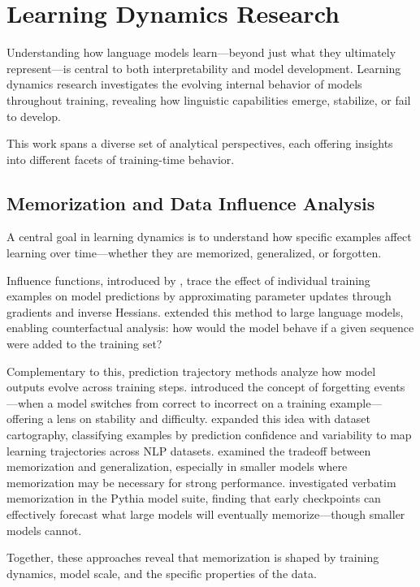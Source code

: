 \section{Learning Dynamics Research}

Understanding how language models learn—beyond just what they ultimately represent—is central to both interpretability and model development. Learning dynamics research investigates the evolving internal behavior of models throughout training, revealing how linguistic capabilities emerge, stabilize, or fail to develop.

This work spans a diverse set of analytical perspectives, each offering insights into different facets of training-time behavior.

\subsection{Memorization and Data Influence Analysis}

A central goal in learning dynamics is to understand how specific examples affect learning over time—whether they are memorized, generalized, or forgotten.

Influence functions, introduced by \citet{koh2017understanding}, trace the effect of individual training examples on model predictions by approximating parameter updates through gradients and inverse Hessians. \citet{grosse2023influence} extended this method to large language models, enabling counterfactual analysis: how would the model behave if a given sequence were added to the training set?

Complementary to this, prediction trajectory methods analyze how model outputs evolve across training steps. \citet{toneva2019empirical} introduced the concept of forgetting events—when a model switches from correct to incorrect on a training example—offering a lens on stability and difficulty. \citet{swayamdipta2020dataset} expanded this idea with dataset cartography, classifying examples by prediction confidence and variability to map learning trajectories across NLP datasets.
\citet{feldman2020does} examined the tradeoff between memorization and generalization, especially in smaller models where memorization may be necessary for strong performance. \citet{biderman2023emergent} investigated verbatim memorization in the Pythia model suite, finding that early checkpoints can effectively forecast what large models will eventually memorize—though smaller models cannot.

Together, these approaches reveal that memorization is shaped by training dynamics, model scale, and the specific properties of the data.

